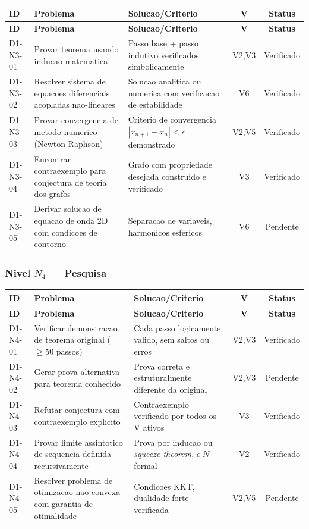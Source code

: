 \begin{longtable}{|p{2.0cm}|p{4.2cm}|p{4.2cm}|c|c|}
\hline
\textbf{ID} & \textbf{Problema} & \textbf{Solucao/Criterio} & \textbf{V} & \textbf{Status} \\
\hline
\endfirsthead
\hline
\textbf{ID} & \textbf{Problema} & \textbf{Solucao/Criterio} & \textbf{V} & \textbf{Status} \\
\hline
\endhead
\hline
\endfoot
D1-N3-01 & Provar teorema usando inducao matematica & Passo base + passo indutivo verificados simbolicamente & V2,V3 & Verificado \\
\hline
D1-N3-02 & Resolver sistema de equacoes diferenciais acopladas nao-lineares & Solucao analitica ou numerica com verificacao de estabilidade & V6 & Verificado \\
\hline
D1-N3-03 & Provar convergencia de metodo numerico (Newton-Raphson) & Criterio de convergencia $|x_{n+1}-x_{n}|<\epsilon$ demonstrado & V2,V5 & Verificado \\
\hline
D1-N3-04 & Encontrar contraexemplo para conjectura de teoria dos grafos & Grafo com propriedade desejada construido e verificado & V3 & Verificado \\
\hline
D1-N3-05 & Derivar solucao de equacao de onda 2D com condicoes de contorno & Separacao de variaveis, harmonicos esfericos & V6 & Pendente \\
\hline
\end{longtable}

\subsubsection{Nivel $N_4$ --- Pesquisa}

\begin{longtable}{|p{2.0cm}|p{4.2cm}|p{4.2cm}|c|c|}
\hline
\textbf{ID} & \textbf{Problema} & \textbf{Solucao/Criterio} & \textbf{V} & \textbf{Status} \\
\hline
\endfirsthead
\hline
\textbf{ID} & \textbf{Problema} & \textbf{Solucao/Criterio} & \textbf{V} & \textbf{Status} \\
\hline
\endhead
\hline
\endfoot
D1-N4-01 & Verificar demonstracao de teorema original ($\geq 50$ passos) & Cada passo logicamente valido, sem saltos ou erros & V2,V3 & Verificado \\
\hline
D1-N4-02 & Gerar prova alternativa para teorema conhecido & Prova correta e estruturalmente diferente da original & V2,V3 & Pendente \\
\hline
D1-N4-03 & Refutar conjectura com contraexemplo explicito & Contraexemplo verificado por todos os V ativos & V3 & Verificado \\
\hline
D1-N4-04 & Provar limite assintotico de sequencia definida recursivamente & Prova por inducao ou \textit{squeeze theorem}, $\epsilon$-$N$ formal & V2 & Verificado \\
\hline
D1-N4-05 & Resolver problema de otimizacao nao-convexa com garantia de otimalidade & Condicoes KKT, dualidade forte verificada & V2,V5 & Pendente \\
\hline
\end{longtable}

